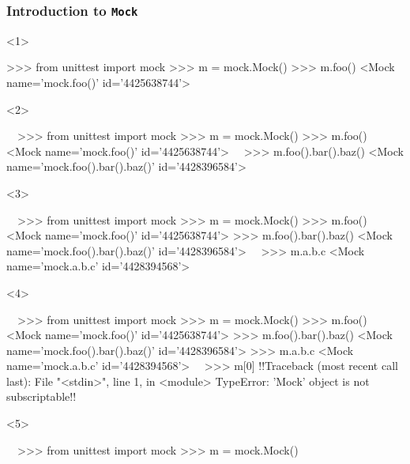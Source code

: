 \documentclass[xcolor={svgnames}]{beamer}
\newcommand{\ttcode}[2][]{\lstinline[style=plain,basicstyle=\ttfamily#1]{#2}}
\begin{document}
\begin{frame}[t,fragile]
    \frametitle{Introduction to \ttcode{Mock}}
    \begin{onlyenv}<1>
        \begin{pyenv}[gobble=12]
            >>> from unittest import mock
            >>> m = mock.Mock()
            >>> m.foo()
            <Mock name='mock.foo()' id='4425638744'>
        \end{pyenv}
    \end{onlyenv}
    \begin{onlyenv}<2>
        \begin{pyenv}[gobble=12]
            ~~>>> from unittest import mock
            >>> m = mock.Mock()
            >>> m.foo()
            <Mock name='mock.foo()' id='4425638744'>~~
            >>> m.foo().bar().baz()
            <Mock name='mock.foo().bar().baz()' id='4428396584'>
        \end{pyenv}
    \end{onlyenv}
    \begin{onlyenv}<3>
        \begin{pyenv}[gobble=12]
            ~~>>> from unittest import mock
            >>> m = mock.Mock()
            >>> m.foo()
            <Mock name='mock.foo()' id='4425638744'>
            >>> m.foo().bar().baz()
            <Mock name='mock.foo().bar().baz()' id='4428396584'>~~
            >>> m.a.b.c
            <Mock name='mock.a.b.c' id='4428394568'>
        \end{pyenv}
    \end{onlyenv}
    \begin{onlyenv}<4>
        \begin{pyenv}[gobble=12]
            ~~>>> from unittest import mock
            >>> m = mock.Mock()
            >>> m.foo()
            <Mock name='mock.foo()' id='4425638744'>
            >>> m.foo().bar().baz()
            <Mock name='mock.foo().bar().baz()' id='4428396584'>
            >>> m.a.b.c
            <Mock name='mock.a.b.c' id='4428394568'>~~
            >>> m[0]
            !!Traceback (most recent call last):
              File "<stdin>", line 1, in <module>
            TypeError: 'Mock' object is not subscriptable!!
        \end{pyenv}
    \end{onlyenv}
    \begin{onlyenv}<5>
        \begin{pyenv}[gobble=12]
            ~~>>> from unittest import mock
            >>> m = mock.Mock()

\end{pyenv}
\end{onlyenv}
\end{frame}
\end{document}
